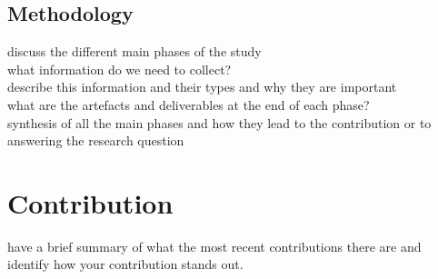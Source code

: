 \documentclass{article}
\begin{document}
\subsection{Methodology}
discuss the different main phases of the study\\
what information do we need to collect?\\
describe this information and their types and why they are important\\
what are the artefacts and deliverables at the end of each phase?\\
synthesis of all the main phases and how they lead to the contribution or to answering the research question\\
\section{Contribution}
have a brief summary of what the most recent contributions there are and identify how your contribution stands out. 


\end{document}
